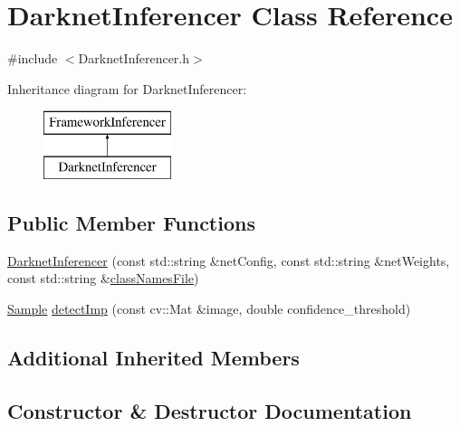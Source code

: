 \hypertarget{class_darknet_inferencer}{}\section{Darknet\+Inferencer Class Reference}
\label{class_darknet_inferencer}


{\ttfamily \#include $<$Darknet\+Inferencer.\+h$>$}

Inheritance diagram for Darknet\+Inferencer\+:\begin{figure}[H]
\begin{center}
\leavevmode
\includegraphics[height=2.000000cm]{class_darknet_inferencer}
\end{center}
\end{figure}
\subsection*{Public Member Functions}
\begin{DoxyCompactItemize}
\item 
\hyperlink{class_darknet_inferencer_ad3ec4de38c45a556057c93a14561e3b4}{Darknet\+Inferencer} (const std\+::string \&net\+Config, const std\+::string \&net\+Weights, const std\+::string \&\hyperlink{class_framework_inferencer_abdb304d43262f48e0438a55778c7540f}{class\+Names\+File})
\item 
\hyperlink{struct_sample}{Sample} \hyperlink{class_darknet_inferencer_a9fb53792b71055b3104e5a54a6190c50}{detect\+Imp} (const cv\+::\+Mat \&image, double confidence\+\_\+threshold)
\end{DoxyCompactItemize}
\subsection*{Additional Inherited Members}


\subsection{Constructor \& Destructor Documentation}
\mbox{\label{class_darknet_inferencer_ad3ec4de38c45a556057c93a14561e3b4}} 
